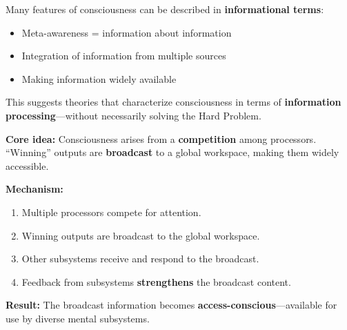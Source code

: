 Many features of consciousness can be described in \textbf{informational terms}:
\begin{itemize}
  \item Meta-awareness = information about information
  \item Integration of information from multiple sources
  \item Making information widely available
\end{itemize}

This suggests theories that characterize consciousness in terms of \textbf{information processing}---without necessarily solving the Hard Problem.

\separator

\begin{defbox}
\textbf{Core idea:} Consciousness arises from a \textbf{competition} among processors. ``Winning'' outputs are \textbf{broadcast} to a global workspace, making them widely accessible.

\textbf{Mechanism:}
\begin{enumerate}
  \item Multiple processors compete for attention.
  \item Winning outputs are broadcast to the global workspace.
  \item Other subsystems receive and respond to the broadcast.
  \item Feedback from subsystems \textbf{strengthens} the broadcast content.
\end{enumerate}

\textbf{Result:} The broadcast information becomes \textbf{access-conscious}---available for use by diverse mental subsystems.
\end{defbox}

\separator

